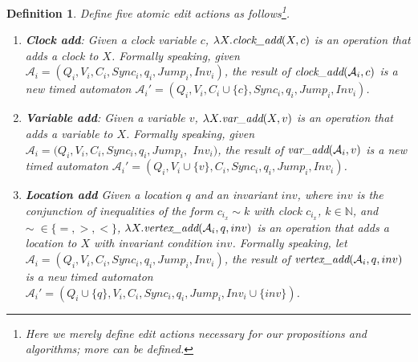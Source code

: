 \documentclass[10pt, a4paper, onecolumn, conference, compsocconf]{IEEEtran}
\newcommand{\emvadd}{\mbox{\em vertex\_add}}
\newcommand{\emcadd}{\mbox{\em clock\_add}}
\newcommand{\emvaradd}{\mbox{\em var\_add}}
\newtheorem{defi}{Definition}
\begin{document}
\begin{defi} Define five atomic edit actions as follows\footnote{Here we merely define edit actions necessary for our propositions and algorithms; more can be defined.}.
\begin{enumerate}
\item \textbf{Clock add}: Given a clock variable $c$, $\lambda X.\emcadd(X,c)$ is an operation that adds a clock to $X$.
      Formally speaking, given  $\mathcal{A}_i = (Q_i, V_i, C_i, Sync_i,q_i,Jump_i, Inv_i)$, the result of $\emcadd(\mathcal{A}_i ,c)$ is a new timed automaton $\mathcal{A}_i' = (Q_i, V_i, C_i\cup\{c\}, Sync_i, q_i, Jump_i, Inv_i)$.
\item \textbf{Variable add}: Given a variable $v$, $\lambda X.\emvaradd(X,v)$ is an operation that adds a variable to $X$.
      Formally speaking, given $\mathcal{A}_i = (Q_i, V_i, C_i, Sync_i,q_i,Jump_i,$ $ Inv_i)$, the result of $\emvaradd(\mathcal{A}_i ,v)$ is a new timed automaton $\mathcal{A}_i' = (Q_i, V_i\cup\{v\}, C_i, Sync_i, q_i, Jump_i, Inv_i)$.
\item \textbf{Location add}
    Given a location $q$ and an invariant $inv$, where $inv$ is the conjunction of inequalities of the form $c_{i_x} \sim k$ with clock $c_{i_x}$,  $k \in \mathbb{N}$, and $\sim\; \in\{=,>,<\}$,
    $\lambda X.\emvadd(\mathcal{A}_i ,q, inv)$  is an operation that adds a location to $X$ with invariant condition $inv$.
   Formally speaking, let $\mathcal{A}_i = (Q_i, V_i, C_i, Sync_i,q_i,Jump_i, Inv_i)$, the result of $\emvadd(\mathcal{A}_i ,q, inv)$ is a new timed automaton
   $\mathcal{A}_i' = (Q_i\cup\{q\}, V_i, C_i, Sync_i, q_i, Jump_i, Inv_i\cup\{inv\})$.


\end{enumerate}
\end{defi}
\end{document}
